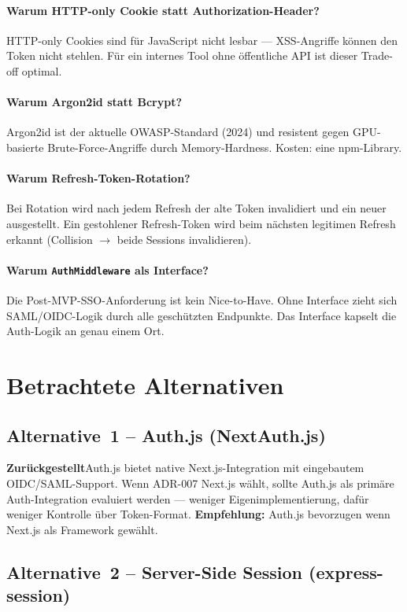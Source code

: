 \documentclass[a4paper, 11pt, oneside]{report}
\newcommand{\code}[1]{\texttt{\small #1}}
\newcommand{\ra}{$\rightarrow$\xspace}
\newcommand{\zurueckgestellt}{\colorbox{notebg}{\small\bfseries\color{noteframe}Zur\"{u}ckgestellt}\;}
\begin{document}
\paragraph{Warum HTTP-only Cookie statt Authorization-Header?}
HTTP-only Cookies sind für JavaScript nicht lesbar --- XSS-Angriffe können den
Token nicht stehlen. Für ein internes Tool ohne öffentliche API ist dieser
Trade-off optimal.

\paragraph{Warum Argon2id statt Bcrypt?}
Argon2id ist der aktuelle OWASP-Standard (2024) und resistent gegen
GPU-basierte Brute-Force-Angriffe durch Memory-Hardness. Kosten: eine
npm-Library.

\paragraph{Warum Refresh-Token-Rotation?}
Bei Rotation wird nach jedem Refresh der alte Token invalidiert und ein neuer
ausgestellt. Ein gestohlener Refresh-Token wird beim nächsten legitimen Refresh
erkannt (Collision \ra beide Sessions invalidieren).

\paragraph{Warum \code{AuthMiddleware} als Interface?}
Die Post-MVP-SSO-Anforderung ist kein Nice-to-Have. Ohne Interface zieht sich
SAML/OIDC-Logik durch alle geschützten Endpunkte. Das Interface kapselt die
Auth-Logik an genau einem Ort.

\section{Betrachtete Alternativen}

\subsection{Alternative~1 -- Auth.js (NextAuth.js)}

\zurueckgestellt Auth.js bietet native Next.js-Integration mit eingebautem
OIDC/SAML-Support. Wenn ADR-007 Next.js wählt, sollte Auth.js als primäre
Auth-Integration evaluiert werden --- weniger Eigenimplementierung,
dafür weniger Kontrolle über Token-Format.
\textbf{Empfehlung:} Auth.js bevorzugen wenn Next.js als Framework gewählt.

\subsection{Alternative~2 -- Server-Side Session (express-session)}
\end{document}
